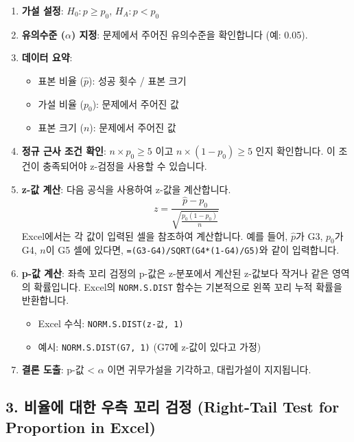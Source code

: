 \documentclass[11pt,a4paper]{article}
\theoremstyle{definition}
\begin{document}
\begin{enumerate}
    \item \textbf{가설 설정}: $H_0: p \ge p_0$, $H_A: p < p_0$
    \item \textbf{유의수준 ($\alpha$) 지정}: 문제에서 주어진 유의수준을 확인합니다 (예: 0.05).
    \item \textbf{데이터 요약}:
    \begin{itemize}
        \item 표본 비율 ($\hat{p}$): 성공 횟수 / 표본 크기
        \item 가설 비율 ($p_0$): 문제에서 주어진 값
        \item 표본 크기 ($n$): 문제에서 주어진 값
    \end{itemize}
    \item \textbf{정규 근사 조건 확인}: $n \times p_0 \ge 5$ 이고 $n \times (1 - p_0) \ge 5$ 인지 확인합니다. 이 조건이 충족되어야 z-검정을 사용할 수 있습니다.
    \item \textbf{z-값 계산}: 다음 공식을 사용하여 z-값을 계산합니다.
    $$z = \frac{\hat{p} - p_0}{\sqrt{\frac{p_0(1-p_0)}{n}}}$$
    Excel에서는 각 값이 입력된 셀을 참조하여 계산합니다. 예를 들어, $\hat{p}$가 G3, $p_0$가 G4, $n$이 G5 셀에 있다면, \texttt{=(G3-G4)/SQRT(G4*(1-G4)/G5)}와 같이 입력합니다.
    \item \textbf{p-값 계산}: 좌측 꼬리 검정의 p-값은 z-분포에서 계산된 z-값보다 작거나 같은 영역의 확률입니다. Excel의 \texttt{NORM.S.DIST} 함수는 기본적으로 왼쪽 꼬리 누적 확률을 반환합니다.
    \begin{itemize}
        \item Excel 수식: \texttt{NORM.S.DIST(z-값, 1)}
        \item 예시: \texttt{NORM.S.DIST(G7, 1)} (G7에 z-값이 있다고 가정)
    \end{itemize}
    \item \textbf{결론 도출}: p-값 < $\alpha$ 이면 귀무가설을 기각하고, 대립가설이 지지됩니다.
\end{enumerate}

\subsection*{3. 비율에 대한 우측 꼬리 검정 (Right-Tail Test for Proportion in Excel)}
\end{document}
